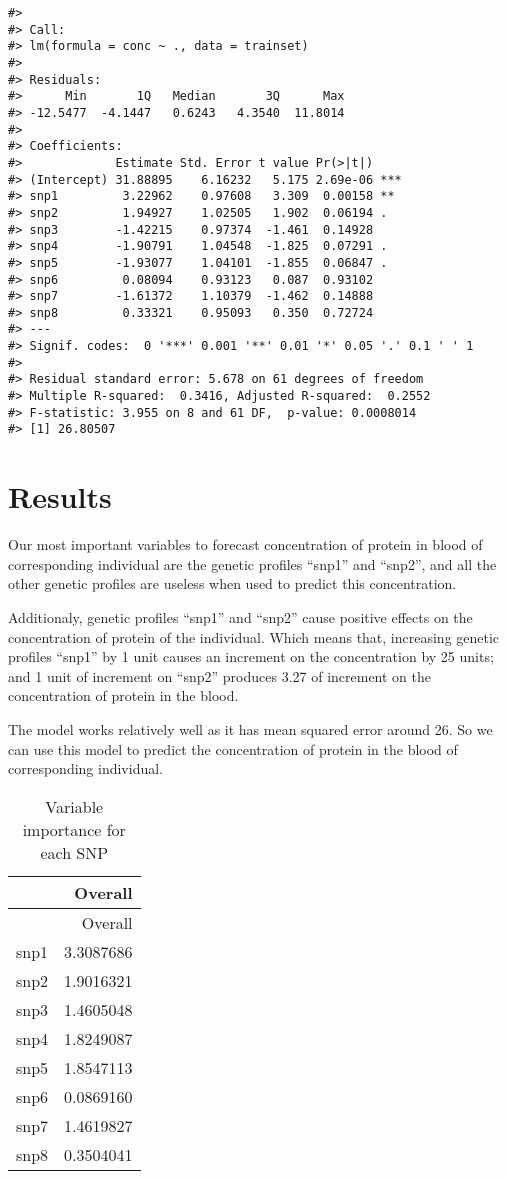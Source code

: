 \documentclass[]{article}
\begin{document}
\footnotesize

\begin{verbatim}
#> 
#> Call:
#> lm(formula = conc ~ ., data = trainset)
#> 
#> Residuals:
#>      Min       1Q   Median       3Q      Max 
#> -12.5477  -4.1447   0.6243   4.3540  11.8014 
#> 
#> Coefficients:
#>             Estimate Std. Error t value Pr(>|t|)    
#> (Intercept) 31.88895    6.16232   5.175 2.69e-06 ***
#> snp1         3.22962    0.97608   3.309  0.00158 ** 
#> snp2         1.94927    1.02505   1.902  0.06194 .  
#> snp3        -1.42215    0.97374  -1.461  0.14928    
#> snp4        -1.90791    1.04548  -1.825  0.07291 .  
#> snp5        -1.93077    1.04101  -1.855  0.06847 .  
#> snp6         0.08094    0.93123   0.087  0.93102    
#> snp7        -1.61372    1.10379  -1.462  0.14888    
#> snp8         0.33321    0.95093   0.350  0.72724    
#> ---
#> Signif. codes:  0 '***' 0.001 '**' 0.01 '*' 0.05 '.' 0.1 ' ' 1
#> 
#> Residual standard error: 5.678 on 61 degrees of freedom
#> Multiple R-squared:  0.3416, Adjusted R-squared:  0.2552 
#> F-statistic: 3.955 on 8 and 61 DF,  p-value: 0.0008014
#> [1] 26.80507
\end{verbatim}

\normalsize

\hypertarget{results}{%
\section{Results}\label{results}}

Our most important variables to forecast concentration of protein in
blood of corresponding individual are the genetic profiles ``snp1'' and
``snp2'', and all the other genetic profiles are useless when used to
predict this concentration.

Additionaly, genetic profiles ``snp1'' and ``snp2'' cause positive
effects on the concentration of protein of the individual. Which means
that, increasing genetic profiles ``snp1'' by 1 unit causes an increment
on the concentration by 25 units; and 1 unit of increment on ``snp2''
produces 3.27 of increment on the concentration of protein in the blood.

The model works relatively well as it has mean squared error around 26.
So we can use this model to predict the concentration of protein in the
blood of corresponding individual.

\begin{longtable}[]{@{}lr@{}}
\caption{Variable importance for each SNP}\tabularnewline
\toprule
& Overall\tabularnewline
\midrule
\endfirsthead
\toprule
& Overall\tabularnewline
\midrule
\endhead
snp1 & 3.3087686\tabularnewline
snp2 & 1.9016321\tabularnewline
snp3 & 1.4605048\tabularnewline
snp4 & 1.8249087\tabularnewline
snp5 & 1.8547113\tabularnewline
snp6 & 0.0869160\tabularnewline
snp7 & 1.4619827\tabularnewline
snp8 & 0.3504041\tabularnewline
\bottomrule
\end{longtable}
\end{document}
